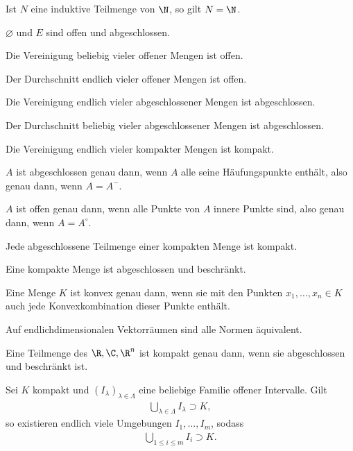 \begin{prop}
Ist $N$ eine induktive Teilmenge von $\N$, so gilt $N = \N$.
\end{prop}
\begin{prop}
$\varnothing$ und $E$ sind offen und abgeschlossen.
\end{prop}
\begin{prop}
Die Vereinigung beliebig vieler offener Mengen ist offen.
\end{prop}
\begin{prop}
Der Durchschnitt endlich vieler offener Mengen ist offen.
\end{prop}
\begin{prop}
Die Vereinigung endlich vieler abgeschlossener Mengen ist
abgeschlossen.
\end{prop}
\begin{prop}
Der Durchschnitt beliebig vieler abgeschlossener Mengen ist
abgeschlossen.
\end{prop}
\begin{prop}
Die Vereinigung endlich vieler kompakter Mengen ist
kompakt.
\end{prop}
\begin{prop}
$A$ ist abgeschlossen genau dann, wenn $A$ alle seine
Häufungspunkte enthält, also genau dann, wenn $A=A^{-}$.
\end{prop}
\begin{prop}
$A$ ist offen genau dann, wenn alle Punkte von $A$ innere Punkte sind, also
genau dann, wenn $A=A^{\circ}$.
\end{prop}
\begin{prop}
Jede abgeschlossene Teilmenge einer kompakten Menge ist kompakt.
\end{prop}
\begin{prop}
Eine kompakte Menge ist abgeschlossen und
beschränkt.
\end{prop}
\begin{prop}
Eine Menge $K$ ist konvex genau dann, wenn sie mit den Punkten $x_1, \ldots, x_n
\in K$ auch jede Konvexkombination dieser Punkte enthält. 
\end{prop}
\begin{prop}
Auf endlichdimensionalen Vektorräumen sind alle Normen äquivalent.
\end{prop}
\begin{prop}
Eine Teilmenge des $\R,\C,\R^n$ ist kompakt genau dann, wenn sie abgeschlossen
und beschränkt ist.
\end{prop}
\begin{prop}
Sei $K$ kompakt und $(I_\lambda)_{\lambda\in\Lambda}$ eine beliebige Familie
offener Intervalle. Gilt 
\begin{align*}
\bigcup \limits_{\lambda\in\Lambda} I_\lambda \supset K,
\end{align*}
so existieren endlich viele Umgebungen $I_1, \ldots, I_m$, sodass
\begin{align*}
\bigcup \limits_{1\le i\le m} I_i \supset K.
\end{align*}
\end{prop}
